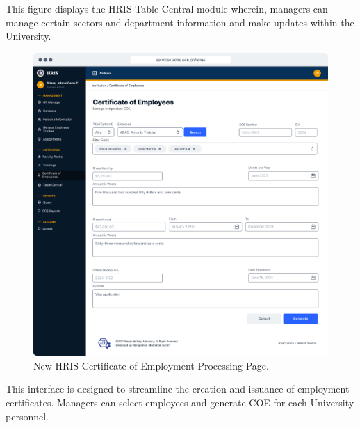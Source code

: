     This figure displays the HRIS Table Central module wherein, managers can manage certain sectors and department information and make updates within the University.

    \begin{figure}[H]
        \centering
        \includegraphics[width=1\linewidth]{figures/app/coe.png}
        \caption{New HRIS Certificate of Employment Processing Page.}
        \label{fig:app-coe}
    \end{figure}

    This interface is designed to streamline the creation and issuance of employment certificates. Managers can select employees and generate COE for each University personnel.